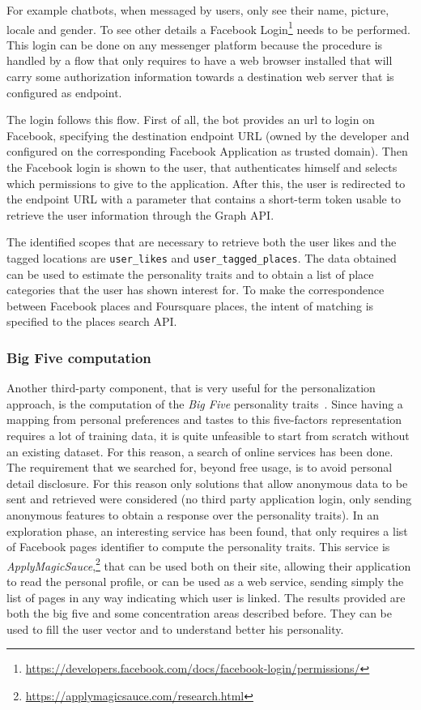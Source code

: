 For example chatbots, when messaged by users, only see their name, picture, locale and gender. To see other details a Facebook Login\footnote{\url{https://developers.facebook.com/docs/facebook-login/permissions/}} needs to be performed. This login can be done on any messenger platform because the procedure is handled by a flow that only requires to have a web browser installed that will carry some authorization information towards a destination web server that is configured as endpoint.

The login follows this flow. First of all, the bot provides an url to login on Facebook, specifying the destination endpoint URL (owned by the developer and configured on the corresponding Facebook Application as trusted domain). Then the Facebook login is shown to the user, that authenticates himself and selects which permissions to give to the application. After this, the user is redirected to the endpoint URL with a parameter that contains a short-term token usable to retrieve the user information through the Graph API.

The identified scopes that are necessary to retrieve both the user likes and the tagged locations are \texttt{user\_likes} and \texttt{user\_tagged\_places}. The data obtained can be used to estimate the personality traits and to obtain a list of place categories that the user has shown interest for. To make the correspondence between Facebook places and Foursquare places, the intent of matching is specified to the places search API.

\subsubsection{Big Five computation}
\label{approachIRbig5}

Another third-party component, that is very useful for the personalization approach, is the computation of the \textit{Big Five} personality traits~\cite{goldberg1993structure}. Since having a mapping from personal preferences and tastes to this five-factors representation requires a lot of training data, it is quite unfeasible to start from scratch without an existing dataset. For this reason, a search of online services has been done. The requirement that we searched for, beyond free usage, is to avoid personal detail disclosure. For this reason only solutions that allow anonymous data to be sent and retrieved were considered (no third party application login, only sending anonymous features to obtain a response over the personality traits). In an exploration phase, an interesting service has been found, that only requires a list of Facebook pages identifier to compute the personality traits. This service is \textit{ApplyMagicSauce},\footnote{\url{https://applymagicsauce.com/research.html}} that can be used both on their site, allowing their application to read the personal profile, or can be used as a web service, sending simply the list of pages in any way indicating which user is linked. The results provided are both the big five and some concentration areas described before. They can be used to fill the user vector and to understand better his personality.

